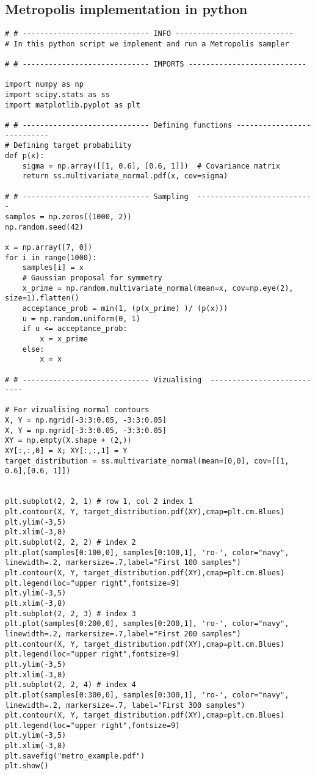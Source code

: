 \begin{appendices}
\section{Metropolis implementation in python}\label{app:MH_code}
\begin{lstlisting}
# # ----------------------------- INFO ---------------------------
# In this python script we implement and run a Metropolis sampler

# # ----------------------------- IMPORTS ---------------------------

import numpy as np
import scipy.stats as ss
import matplotlib.pyplot as plt

# # ----------------------------- Defining functions ---------------------------
# Defining target probability
def p(x):
    sigma = np.array([[1, 0.6], [0.6, 1]])  # Covariance matrix
    return ss.multivariate_normal.pdf(x, cov=sigma)

# # ----------------------------- Sampling  ---------------------------
samples = np.zeros((1000, 2))
np.random.seed(42)

x = np.array([7, 0])
for i in range(1000):
    samples[i] = x
    # Gaussian proposal for symmetry
    x_prime = np.random.multivariate_normal(mean=x, cov=np.eye(2), size=1).flatten()
    acceptance_prob = min(1, (p(x_prime) )/ (p(x)))
    u = np.random.uniform(0, 1)
    if u <= acceptance_prob:
        x = x_prime
    else:
        x = x

# # ----------------------------- Vizualising  ---------------------------
 
# For vizualising normal contours       
X, Y = np.mgrid[-3:3:0.05, -3:3:0.05]    
X, Y = np.mgrid[-3:3:0.05, -3:3:0.05]
XY = np.empty(X.shape + (2,))
XY[:,:,0] = X; XY[:,:,1] = Y
target_distribution = ss.multivariate_normal(mean=[0,0], cov=[[1, 0.6],[0.6, 1]])


plt.subplot(2, 2, 1) # row 1, col 2 index 1
plt.contour(X, Y, target_distribution.pdf(XY),cmap=plt.cm.Blues)
plt.ylim(-3,5)
plt.xlim(-3,8)
plt.subplot(2, 2, 2) # index 2
plt.plot(samples[0:100,0], samples[0:100,1], 'ro-', color="navy", linewidth=.2, markersize=.7,label="First 100 samples")
plt.contour(X, Y, target_distribution.pdf(XY),cmap=plt.cm.Blues)
plt.legend(loc="upper right",fontsize=9)
plt.ylim(-3,5)
plt.xlim(-3,8)
plt.subplot(2, 2, 3) # index 3
plt.plot(samples[0:200,0], samples[0:200,1], 'ro-', color="navy", linewidth=.2, markersize=.7,label="First 200 samples")
plt.contour(X, Y, target_distribution.pdf(XY),cmap=plt.cm.Blues)
plt.legend(loc="upper right",fontsize=9)
plt.ylim(-3,5)
plt.xlim(-3,8)
plt.subplot(2, 2, 4) # index 4
plt.plot(samples[0:300,0], samples[0:300,1], 'ro-', color="navy", linewidth=.2, markersize=.7, label="First 300 samples")
plt.contour(X, Y, target_distribution.pdf(XY),cmap=plt.cm.Blues)
plt.legend(loc="upper right",fontsize=9)
plt.ylim(-3,5)
plt.xlim(-3,8)
plt.savefig("metro_example.pdf")
plt.show()

\end{lstlisting}

\end{appendices}
